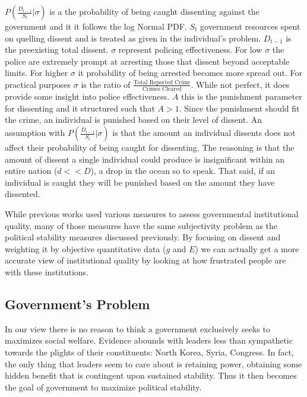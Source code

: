 \documentclass[12pt]{article}
\begin{document}
\begin{spacing}{1.5}
$P \left(\frac{D_{t-1}}{S_t}\Big|\sigma \right)$ is a the probability of being caught dissenting against the government and it it follows the log Normal PDF. $S_t$ government resources spent on quelling dissent and is treated as given in the individual's problem. $D_{t-1}$ is the preexisting total dissent. $\sigma$ represent policing effectiveness. For low $\sigma$ the police are extremely prompt at arresting those that dissent beyond acceptable limits. For higher $\sigma$ it probability of being arrested becomes more spread out. For practical purposes $\sigma$ is the ratio of $\frac{\text{Total Reported Crime}}{\text{Crimes Cleared}}$. While not perfect, it does provide some insight into police effectiveness. $A$ this is the punishment parameter for dissenting and it structured such that $A>1$. Since the punishment should fit the crime, an individual is punished based on their level of dissent. An assumption with $P \left(\frac{D_{t-1}}{S_t}\Big|\sigma \right)$ is that the amount an individual dissents does not affect their probability of being caught for dissenting. The reasoning is that the amount of dissent a single individual could produce is insignificant within an entire nation ($d<<D$), a drop in the ocean so to speak. That said, if an individual is caught they will be punished based on the amount they have dissented.   


While previous works used various measures to assess governmental institutional quality, many of those measures have the same subjectivity problem as the political stability measures discussed previously. By focusing on dissent and weighting it by objective quantitative data ($g$ and $E$) we can actually get a more accurate view of institutional quality by looking at how frustrated people are with these institutions.     

\subsection{Government's Problem} 

In our view there is no reason to think a government exclusively seeks to maximizes social welfare. Evidence abounds with leaders less than sympathetic towards the plights of their constituents: North Korea, Syria, Congress. In fact, the only thing that leaders seem to care about is retaining power, obtaining some hidden benefit that is contingent upon sustained stability. Thus it then becomes the goal of government to maximize political stability. 


\end{spacing}
\end{document}
